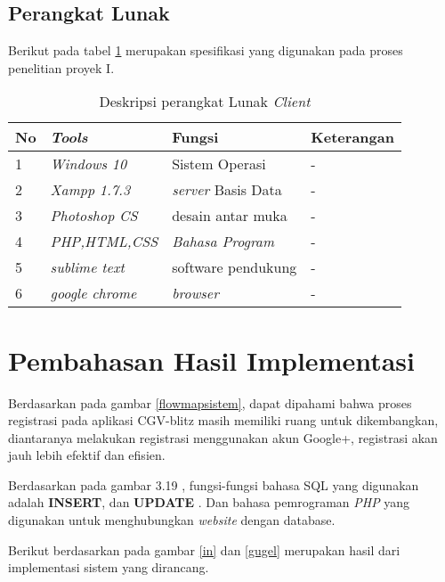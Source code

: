 \subsection{Perangkat Lunak}
\par
Berikut pada tabel \ref{lunak} merupakan spesifikasi yang digunakan pada proses penelitian proyek I.

\begin{table}[!htbp]
\captionsetup{singlelinecheck=off}
\caption{Deskripsi perangkat Lunak \textit{Client}}
\label{lunak}
\begin{tabular}{|l|l|l|l|}
\hline
No & \textit{Tools} & Fungsi & Keterangan \\
\hline

1 &  \textit{Windows 10} & Sistem Operasi  & -  \\

\hline

2 &  \textit{Xampp 1.7.3} & \textit{server} Basis Data & - \\
\hline

3 &  \textit{Photoshop CS} & desain antar muka & - \\
\hline

4 &  \textit{PHP,HTML,CSS} & \textit{Bahasa Program} & -  \\    
\hline

5 & \textit{sublime text} & software pendukung & - \\
\hline

6 & \textit{google chrome} & \textit{browser} & - \\
\hline
\end{tabular}
\end{table}


\section{Pembahasan Hasil Implementasi}
\par
Berdasarkan pada gambar \ref{flowmapsistem}, dapat dipahami bahwa proses registrasi pada aplikasi CGV-blitz masih memiliki ruang untuk dikembangkan, diantaranya melakukan registrasi menggunakan akun Google+, registrasi akan jauh lebih efektif dan efisien.
\par
Berdasarkan pada gambar 3.19 , fungsi-fungsi bahasa SQL yang digunakan adalah  \textbf{INSERT}, dan \textbf{UPDATE} . Dan bahasa pemrograman \textit{PHP} yang digunakan untuk menghubungkan \textit{website} dengan database.
\par 
Berikut berdasarkan pada gambar \ref{in} dan \ref{gugel} merupakan hasil dari implementasi sistem yang dirancang.

